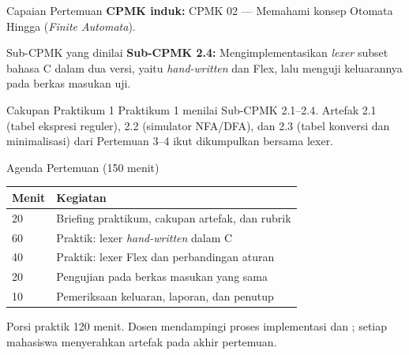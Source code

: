 \documentclass[aspectratio=169,10pt,t]{beamer}
\begin{document}

\begin{frame}{Capaian Pertemuan}
  \textbf{CPMK induk:} CPMK 02 --- Memahami konsep Otomata Hingga
  (\textit{Finite Automata}).

  \vspace{3pt}
  \begin{block}{Sub-CPMK yang dinilai}
    \small
    \textbf{Sub-CPMK 2.4:} Mengimplementasikan \textit{lexer} subset
    bahasa C dalam dua versi, yaitu \textit{hand-written} dan Flex,
    lalu menguji keluarannya pada berkas masukan uji.
  \end{block}

  \vspace{3pt}
  \begin{exampleblock}{Cakupan Praktikum 1}
    \footnotesize
    Praktikum 1 menilai Sub-CPMK 2.1--2.4. Artefak 2.1 (tabel ekspresi
    reguler), 2.2 (simulator NFA/DFA), dan 2.3 (tabel konversi dan
    minimalisasi) dari Pertemuan 3--4 ikut dikumpulkan bersama lexer.
  \end{exampleblock}
\end{frame}

\begin{frame}{Agenda Pertemuan (150 menit)}
  \small
  \begin{tabular}{@{}p{1.4cm}p{12.3cm}@{}}
    \toprule
    \textbf{Menit} & \textbf{Kegiatan} \\
    \midrule
    20 & Briefing praktikum, cakupan artefak, dan rubrik \\
    60 & Praktik: lexer \textit{hand-written} dalam C \\
    40 & Praktik: lexer Flex dan perbandingan aturan \\
    20 & Pengujian pada berkas masukan yang sama \\
    10 & Pemeriksaan keluaran, laporan, dan penutup \\
    \bottomrule
  \end{tabular}

  \vspace{6pt}
  {\scriptsize\color{ubbblue!75}Porsi praktik 120 menit. Dosen mendampingi
  proses implementasi dan ; setiap mahasiswa menyerahkan
  artefak pada akhir pertemuan.}
\end{frame}
\end{document}
